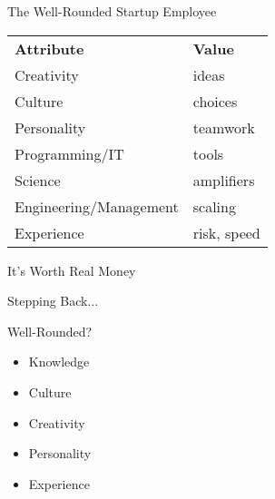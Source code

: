 \documentclass{beamer}
\begin{document}
\begin{frame}{The Well-Rounded Startup Employee}

\begin{centering}

\begin{tabular}{ll}
\textbf{Attribute}         &  \textbf{Value}  \vspace{0.5cm} \\

Creativity                 &  ideas        \\ 
Culture                    &  choices      \vspace{0.5cm} \\ 

Personality                &  teamwork     \vspace{0.5cm} \\

Programming/IT             &  tools        \\
Science                    &  amplifiers   \\
Engineering/Management     &  scaling      \vspace{0.5cm} \\ 

Experience                 &  risk, speed         
\end{tabular}

\end{centering}

\end{frame}

\begin{frame}{It's Worth Real Money}
\end{frame}

\begin{frame}{Stepping Back...}

Well-Rounded?
\begin{itemize}
  \item Knowledge
  \item Culture
  \item Creativity
  \item Personality
  \item Experience
\end{itemize}

\end{frame}
\end{document}
